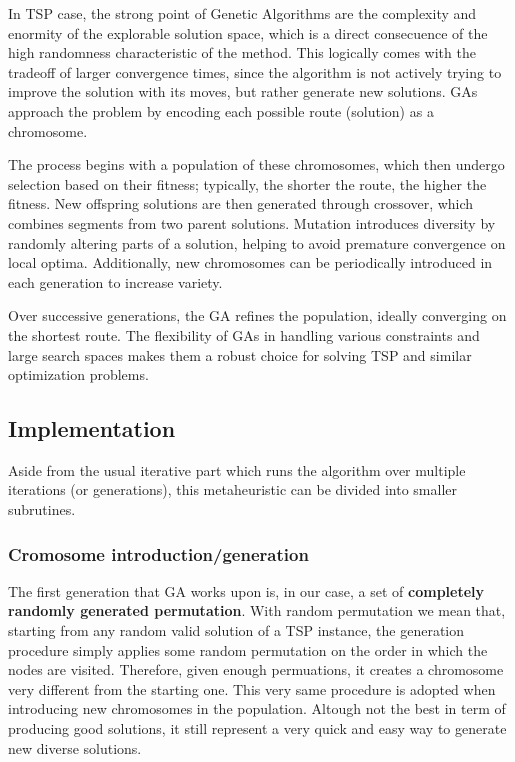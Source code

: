 In TSP case, the strong point of Genetic Algorithms are the complexity and enormity of the explorable solution space, which is a direct consecuence of the high randomness characteristic of the method. 
This logically comes with the tradeoff of larger convergence times, since the algorithm is not actively trying to improve the solution with its moves, but rather generate new solutions.
GAs approach the problem by encoding each possible route (solution) as a chromosome.

The process begins with a population of these chromosomes, which then undergo selection based on their fitness; typically, the shorter the route, the higher the fitness.
New offspring solutions are then generated through crossover, which combines segments from two parent solutions.
Mutation introduces diversity by randomly altering parts of a solution, helping to avoid premature convergence on local optima.
Additionally, new chromosomes can be periodically introduced in each generation to increase variety.

Over successive generations, the GA refines the population, ideally converging on the shortest route.
The flexibility of GAs in handling various constraints and large search spaces makes them a robust choice for solving TSP and similar optimization problems.

\subsection{Implementation}

Aside from the usual iterative part which runs the algorithm over multiple iterations (or generations), this metaheuristic can be divided into smaller subrutines.

\subsubsection{Cromosome introduction/generation}

The first generation that GA works upon is, in our case, a set of \textbf{completely randomly generated permutation}.
With random permutation we mean that, starting from any random valid solution of a TSP instance, the generation procedure simply applies some random permutation on the order in which the nodes are visited.
Therefore, given enough permuations, it creates a chromosome very different from the starting one.
This very same procedure is adopted when introducing new chromosomes in the population.
Altough not the best in term of producing good solutions, it still represent a very quick and easy way to generate new diverse solutions.

